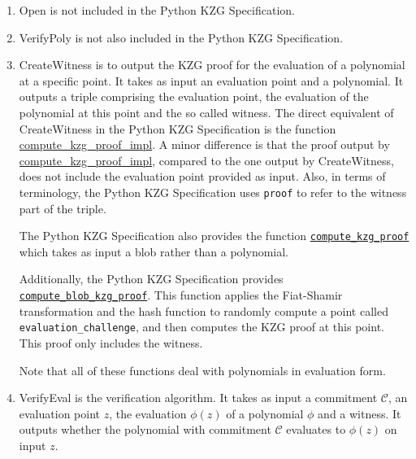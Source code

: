 \documentclass[12pt]{galois-whitepaper}
\begin{document}
\begin{enumerate}
\begin{enumerate}
    \item \textsf{Open} is not included in the Python KZG Specification.

    \item \textsf{VerifyPoly} is not also included in the Python KZG Specification.

    \item \textsf{CreateWitness} is to output the KZG proof for the evaluation of a polynomial at a specific point.
    It takes as input an evaluation point and a polynomial.
    It outputs a triple comprising the evaluation point, the evaluation of the polynomial at this point and the so called witness.
    The direct equivalent of  \textsf{CreateWitness} in the Python KZG Specification is the function  \href{https://github.com/ethereum/consensus-specs/blob/dev/specs/deneb/polynomial-commitments.md\#compute_kzg_proof_impl}{compute\_kzg\_proof\_impl}.
    A minor difference is that the proof output by \href{https://github.com/ethereum/consensus-specs/blob/dev/specs/deneb/polynomial-commitments.md\#compute_kzg_proof_impl}{compute\_kzg\_proof\_impl}, compared to the one output by \textsf{CreateWitness}, does not include the evaluation point provided as input.
    Also, in terms of terminology, the Python KZG Specification uses \texttt{proof} to refer to the witness part of the triple.

    The Python KZG Specification also provides the function \href{https://github.com/ethereum/consensus-specs/blob/dev/specs/deneb/polynomial-commitments.md\#compute_kzg_proof}{\texttt{compute\_kzg\_proof}} which takes as input a blob rather than a polynomial.

    Additionally, the Python KZG Specification provides
    \href{https://github.com/ethereum/consensus-specs/blob/dev/specs/deneb/polynomial-commitments.md\#compute_blob_kzg_proof}{\texttt{compute\_blob\_kzg\_proof}}.
    This function applies the Fiat-Shamir transformation and the hash function to randomly compute a point called \texttt{evaluation\_challenge}, and then computes the KZG proof at this point.
    This proof only includes the witness.

    Note that all of these functions deal with polynomials in evaluation form.

    \item \textsf{VerifyEval} is the verification algorithm.
    It takes as input a commitment $\mathcal{C}$, an evaluation point $z$, the evaluation $\phi(z)$ of a polynomial $\phi$ and a witness.
    It outputs whether the polynomial with commitment $\mathcal{C}$ evaluates to $\phi(z)$ on input $z$.


\end{enumerate}
\end{enumerate}
\end{document}
